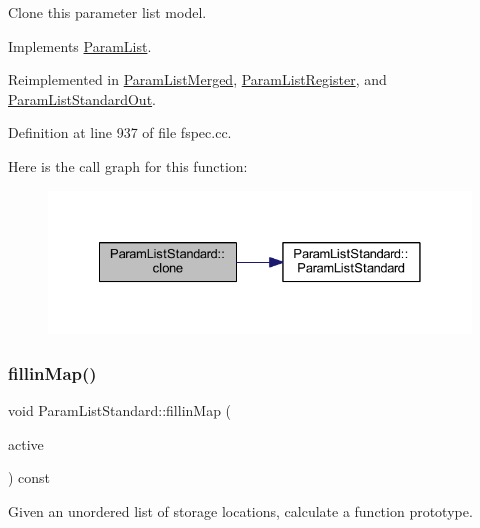 Clone this parameter list model. 



Implements \mbox{\hyperlink{class_param_list_ac6ab0a8bc1ea2e7f84a5148c6be721d8}{Param\+List}}.



Reimplemented in \mbox{\hyperlink{class_param_list_merged_a98c49178195f02a964dd87b9e8fcddfa}{Param\+List\+Merged}}, \mbox{\hyperlink{class_param_list_register_a1c4f79c909f11b3859f93f293acb9a1d}{Param\+List\+Register}}, and \mbox{\hyperlink{class_param_list_standard_out_acec6ec68623556e54bdf42a61c20ea0e}{Param\+List\+Standard\+Out}}.



Definition at line 937 of file fspec.\+cc.

Here is the call graph for this function\+:
\nopagebreak
\begin{figure}[H]
\begin{center}
\leavevmode
\includegraphics[width=328pt]{class_param_list_standard_a8257219823fdb31ac4aa59d2c0c640e5_cgraph}
\end{center}
\end{figure}
\mbox{\label{class_param_list_standard_a7fa7043f5c6bba995e2ea716ca16ccaf}} 
\subsubsection{\texorpdfstring{fillinMap()}{fillinMap()}}
{\footnotesize\ttfamily void Param\+List\+Standard\+::fillin\+Map (\begin{DoxyParamCaption}\item[{\mbox{\hyperlink{class_param_active}{Param\+Active}} $\ast$}]{active }\end{DoxyParamCaption}) const\hspace{0.3cm}{\ttfamily [virtual]}}



Given an unordered list of storage locations, calculate a function prototype. 

